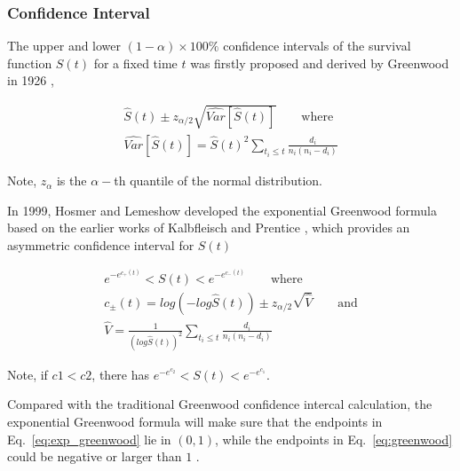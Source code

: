 \subsubsection{Confidence Interval}

The upper and lower $(1-\alpha) \times 100 \%$ confidence intervals of the survival function $S(t)$ for a fixed time $t$ was firstly proposed and derived by Greenwood in 1926 \cite{greenwoodnatural},


\begin{align} \label{eq:greenwood}
  \widehat{S}(t) \pm z_{\alpha / 2} \sqrt{\widehat{Var}[\widehat{S}(t)]}
  \qquad\text{where}\\
  \widehat{Var}[\widehat{S}(t)] = \widehat{S}(t)^2\sum_{t_i \leq t} \frac{d_i}{n_i(n_i - d_i)}
\end{align}

Note, $z_{\alpha}$ is the $\alpha -$th quantile of the normal distribution.

In 1999, Hosmer and Lemeshow \cite{hosmer2011applied} developed the exponential Greenwood formula based on the earlier works of Kalbfleisch and Prentice \cite{kalbfleisch2011statistical}, which provides an asymmetric confidence interval for $S(t)$

\begin{align} \label{eq:exp_greenwood}
  e^{-e^{c_{+}(t)}} < S(t) < e^{-e^{c_{-}(t)}}
  \qquad\text{where}\\
  c_{\pm}(t) = log(-log\widehat{S}(t)) \pm z_{\alpha / 2} \sqrt{\widehat{V}}
  \qquad\text{and}\\
  \widehat{V} = \frac{1}{(log\widehat{S}(t))^2} \sum_{t_i \leq t} \frac{d_i}{n_i(n_i - d_i)}
\end{align}

Note, if $c1<c2$, there has $e^{-e^{c_2}} < S(t) < e^{-e^{c_1}}$.


Compared with the traditional Greenwood confidence intercal calculation, the exponential Greenwood formula will make sure that the endpoints in Eq.~\ref{eq:exp_greenwood} lie in $(0, 1)$, while the endpoints in Eq.~\ref{eq:greenwood} could be negative or larger than $1$ \cite{sawyer2003greenwood}. 




